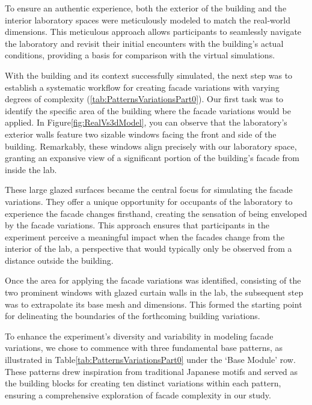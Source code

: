 To ensure an authentic experience, both the exterior of the building and the interior laboratory spaces were meticulously modeled to match the real-world dimensions.
This meticulous approach allows participants to seamlessly navigate the laboratory and revisit their initial encounters with the building's actual conditions, providing a basis for comparison with the virtual simulations.

With the building and its context successfully simulated, the next step was to establish a systematic workflow for creating facade variations with varying degrees of complexity (\ref{tab:PatternsVariationsPart0}).
Our first task was to identify the specific area of the building where the facade variations would be applied.
In Figure\ref{fig:RealVs3dModel}, you can observe that the laboratory's exterior walls feature two sizable windows facing the front and side of the building.
Remarkably, these windows align precisely with our laboratory space, granting an expansive view of a significant portion of the building's facade from inside the lab.

These large glazed surfaces became the central focus for simulating the facade variations.
They offer a unique opportunity for occupants of the laboratory to experience the facade changes firsthand, creating the sensation of being enveloped by the facade variations.
This approach ensures that participants in the experiment perceive a meaningful impact when the facades change from the interior of the lab, a perspective that would typically only be observed from a distance outside the building.

Once the area for applying the facade variations was identified, consisting of the two prominent windows with glazed curtain walls in the lab, the subsequent step was to extrapolate its base mesh and dimensions.
This formed the starting point for delineating the boundaries of the forthcoming building variations.

To enhance the experiment's diversity and variability in modeling facade variations, we chose to commence with three fundamental base patterns, as illustrated in Table\ref{tab:PatternsVariationsPart0} under the `Base Module' row.
These patterns drew inspiration from traditional Japanese motifs and served as the building blocks for creating ten distinct variations within each pattern, ensuring a comprehensive exploration of facade complexity in our study.

